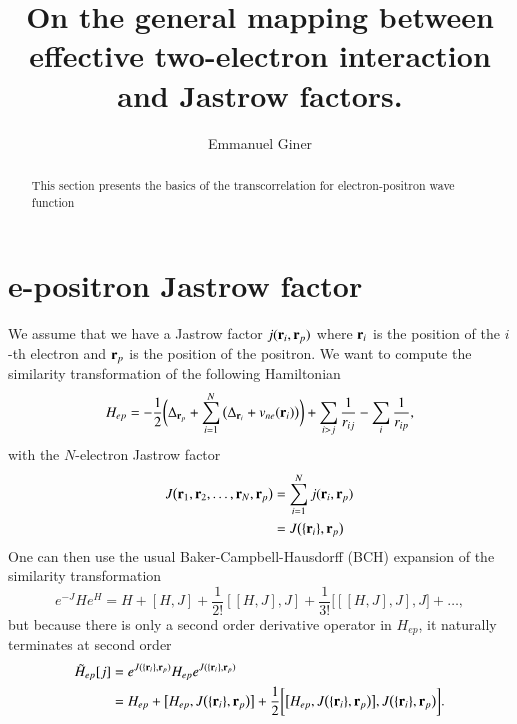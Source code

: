 \documentclass[aip,jcp,reprint,noshowkeys,superscriptaddress]{revtex4-1}
\newcommand{\bri}[1]{{\bf r}_{#1}}
\newcommand{\Hep}[0]{H_{ep}}
\newcommand{\Hept}[0]{\tilde{H}_{ep}}
\begin{document}
	

\title{On the general mapping between effective two-electron interaction and Jastrow factors.}

\author{Emmanuel Giner}

\begin{abstract}
This section presents the basics of the transcorrelation for electron-positron wave function
\end{abstract}

\maketitle
\section{e-positron Jastrow factor}
We assume that we have a Jastrow factor $j(\bri{i},\bri{p})$ where $\bri{i}$ is the position of the $i$-th electron and $\bri{p}$ is the position of the positron. 
We want to compute the similarity transformation of the following Hamiltonian
\begin{equation}
 \Hep = -\frac{1}{2} \bigg( \Delta_{\bri{p}} + \sum_{i=1}^{N} \big(\Delta_{\bri{i}} + v_{ne}(\bri{i})\big) \bigg) + \sum_{i>j}\frac{1}{r_{ij}} - \sum_{i} \frac{1}{r_{ip}},
\end{equation}
with the $N$-electron Jastrow factor 
\begin{equation}
 \begin{aligned}
 J\big( \bri{1}, \bri{2}, \hdots, \bri{N}, \bri{p}\big) & = \sum_{i=1}^N j(\bri{i},\bri{p}) \\
                                                        & = J\big(\{\bri{i} \},\bri{p}\big)
 \end{aligned}
\end{equation}
One can then use the usual Baker-Campbell-Hausdorff (BCH) expansion of the similarity transformation 
\begin{equation}
 e^{-J}He^{H} = H + [H,J] + \frac{1}{2!} [[H,J],J] + \frac{1}{3!} \big[[[H,J],J],J\big] + \hdots, 
\end{equation}
but because there is only a second order derivative operator in $\Hep$, it naturally terminates at second order 
\begin{equation}
 \begin{aligned}
 \Hept[j] &= e^{J(\{\bri{i} \},\bri{p})} \Hep e^{J(\{\bri{i} \},\bri{p})} \\
          &= \Hep + \big[\Hep,J\big(\{\bri{i} \},\bri{p}\big)\big] + \frac{1}{2} \bigg[\big[\Hep,J\big(\{\bri{i} \},\bri{p}\big)\big], J\big(\{\bri{i} \},\bri{p}\big) \bigg].
 \end{aligned}
\end{equation}
\end{document}
